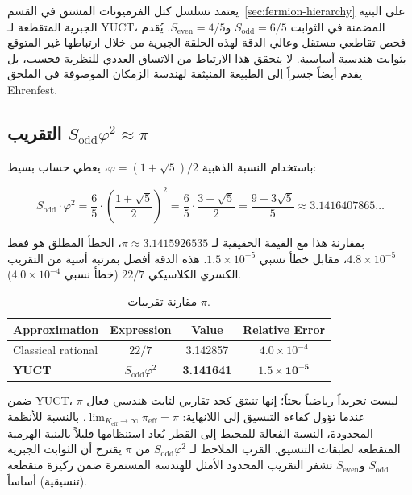 \documentclass[12pt,a4paper]{article}
\begin{document}
	يعتمد تسلسل كتل الفرميونات المشتق في القسم~\ref{sec:fermion-hierarchy} على البنية الجبرية المتقطعة لـ YUCT، المضمنة في الثوابت \(S_{\mathrm{odd}} = 6/5\) و\(S_{\mathrm{even}} = 4/5\). يُقدم فحص تقاطعي مستقل وعالي الدقة لهذه الحلقة الجبرية من خلال ارتباطها غير المتوقع بثوابت هندسية أساسية. لا يتحقق هذا الارتباط من الاتساق العددي للنظرية فحسب، بل يقدم أيضاً جسراً إلى الطبيعة المنبثقة لهندسة الزمكان الموصوفة في الملحق Ehrenfest.
	
	\subsection{التقريب \(S_{\mathrm{odd}} \varphi^2 \approx \pi\)}
	
	باستخدام النسبة الذهبية \(\varphi = (1+\sqrt{5})/2\)، يعطي حساب بسيط:
	
	\begin{equation}
		S_{\mathrm{odd}} \cdot \varphi^2 = \frac{6}{5} \cdot \left(\frac{1+\sqrt{5}}{2}\right)^2 
		= \frac{6}{5} \cdot \frac{3+\sqrt{5}}{2} 
		= \frac{9 + 3\sqrt{5}}{5} \approx 3.1416407865\dots
	\end{equation}
	
	بمقارنة هذا مع القيمة الحقيقية لـ \(\pi \approx 3.1415926535\)، الخطأ المطلق هو فقط \(4.8 \times 10^{-5}\)، مقابل خطأ نسبي \(1.5 \times 10^{-5}\). هذه الدقة أفضل بمرتبة أسية من التقريب الكسري الكلاسيكي \(22/7\) (خطأ نسبي \(4.0 \times 10^{-4}\)).
	
	\begin{otherlanguage}{english}
		\begin{table}[htbp]
			\centering
			\caption{مقارنة تقريبات \(\pi\).}
			\label{tab:pi_approx}
			\begin{tabular}{lccc}
				\toprule
				\textbf{Approximation} & \textbf{Expression} & \textbf{Value} & \textbf{Relative Error} \\
				\midrule
				Classical rational & \(22/7\) & 3.142857 & \(4.0 \times 10^{-4}\) \\
				\textbf{YUCT} & \(S_{\mathrm{odd}}\varphi^2\) & \textbf{3.141641} & \(\mathbf{1.5 \times 10^{-5}}\) \\
				\bottomrule
			\end{tabular}
		\end{table}
	\end{otherlanguage}
	
	ضمن YUCT، \(\pi\) ليست تجريداً رياضياً بحتاً؛ إنها تنبثق كحد تقاربي لثابت هندسي فعال عندما تؤول كفاءة التنسيق إلى اللانهاية: \(\lim_{K_{\mathrm{eff}} \to \infty} \pi_{\mathrm{eff}} = \pi\). بالنسبة للأنظمة المحدودة، النسبة الفعالة للمحيط إلى القطر يُعاد استنظامها قليلاً بالبنية الهرمية المتقطعة لطبقات التنسيق. القرب الملاحظ لـ \(S_{\mathrm{odd}}\varphi^2\) من \(\pi\) يقترح أن الثوابت الجبرية \(S_{\mathrm{odd}}\) و\(S_{\mathrm{even}}\) تشفر التقريب المحدود الأمثل للهندسة المستمرة ضمن ركيزة متقطعة (تنسيقية) أساساً.
	
\end{document}
